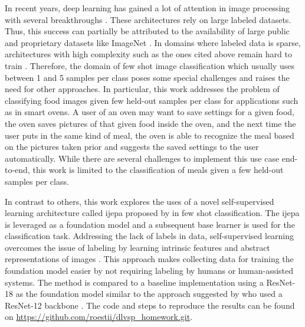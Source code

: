 In recent years, deep learning has gained a lot of attention in image processing with several breakthroughs
\cite{he_deep_2015, krizhevsky_imagenet_2012, tan_efficientnet_2020}. These architectures rely on large labeled datasets. 
Thus, this success can 
partially be attributed to the availability of large public and proprietary datasets like ImageNet \cite{deng_imagenet_2009}. 
In domains where labeled data is sparse, architectures with high complexity such as the ones cited above 
remain hard to train \cite{brigato_close_2021}. Therefore, the domain of few shot image classification which
usually uses between 1 and 5 samples per class poses some special challenges and raises the need for other 
approaches. In particular, this work addresses the problem of classifying food images given few held-out 
samples per class for applications such as in smart ovens. A user of an oven may want to save settings for 
a given food, the oven saves pictures of that given food inside the oven, and the next time 
the user puts in the same kind of meal, the oven is able to recognize the meal based on the pictures taken 
prior and suggests the saved settings to the user automatically. While there are several challenges to implement 
this use case end-to-end, this work is limited to the classification of meals given a few held-out samples 
per class.

In contrast to others, this work explores the uses of a novel self-supervised learning architecture called 
\gls{ijepa} \cite{assran_self-supervised_2023} proposed by \citeauthor{assran_self-supervised_2023} 
in few shot classification. The \gls{ijepa} is leveraged as a foundation model and a subsequent base learner is 
used for the classification task.
Addressing the lack of labels in data, self-supervised learning overcomes the issue of labeling by learning
intrinsic features and abstract representations of images \cite{shwartz-ziv_what_2022}.
This approach makes collecting data for training the foundation model easier by not requiring labeling by humans 
or human-assisted systems. The method is compared to a baseline implementation using a ResNet-18 
as the foundation model similar to the approach suggested by
\citeauthor{tian_rethinking_2020} who used a ResNet-12 backbone \cite{tian_rethinking_2020}.
The code and steps to reproduce the results can be found on \url{https://github.com/roestii/dlvsp_homework.git}.
